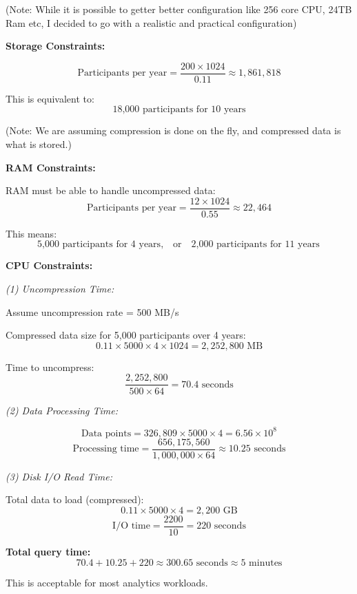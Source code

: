 \documentclass[a4paper, 12pt]{article}
\begin{document}
(Note: While it is possible to getter better configuration like 256 core CPU, 24TB Ram etc, I decided to go with a realistic and practical configuration)

\vspace{0.75em}

\textbf{Storage Constraints:}

\[
\text{Participants per year} = \frac{200 \times 1024}{0.11} \approx 1,861,818
\]

This is equivalent to:
\[
\text{18,000 participants for 10 years}
\]

(Note: We are assuming compression is done on the fly, and compressed data is what is stored.)

\vspace{0.75em}

\textbf{RAM Constraints:}

RAM must be able to handle uncompressed data:
\[
\text{Participants per year} = \frac{12 \times 1024}{0.55} \approx 22,464
\]

This means:
\[
\text{5,000 participants for 4 years}, \quad \text{or} \quad \text{2,000 participants for 11 years}
\]

\vspace{0.75em}

\textbf{CPU Constraints:}

\textit{(1) Uncompression Time:}

Assume uncompression rate = 500 MB/s

Compressed data size for 5,000 participants over 4 years:
\[
0.11 \times 5000 \times 4 \times 1024 = 2,252,800 \text{ MB}
\]

Time to uncompress:
\[
\frac{2,252,800}{500 \times 64} = 70.4 \text{ seconds}
\]

\textit{(2) Data Processing Time:}

\[
\text{Data points} = 326,809 \times 5000 \times 4 = 6.56 \times 10^8
\]
\[
\text{Processing time} = \frac{656,175,560}{1,000,000 \times 64} \approx 10.25 \text{ seconds}
\]

\textit{(3) Disk I/O Read Time:}

Total data to load (compressed):
\[
0.11 \times 5000 \times 4 = 2,200 \text{ GB}
\]
\[
\text{I/O time} = \frac{2200}{10} = 220 \text{ seconds}
\]

\textbf{Total query time:}
\[
70.4 + 10.25 + 220 \approx 300.65 \text{ seconds} \approx 5 \text{ minutes}
\]

This is acceptable for most analytics workloads.
\end{document}
